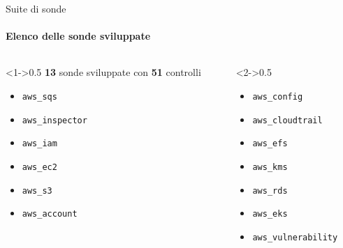 \documentclass{beamer}
\begin{document}
\begin{frame}{Suite di sonde}
    \framesubtitle{Elenco delle sonde sviluppate}
    \begin{columns}
        \begin{column}<1->{0.5\textwidth}
            \textbf{13} sonde sviluppate con \textbf{51} controlli
            \begin{itemize}
                \item \texttt{aws\_sqs}
                \item \texttt{aws\_inspector}
                \item \texttt{aws\_iam}
                \item \texttt{aws\_ec2}
                \item \texttt{aws\_s3}
                \item \texttt{aws\_account}
            \end{itemize}
        \end{column}
        \begin{column}<2->{0.5\textwidth}
            \begin{itemize}
                \item \texttt{aws\_config}
                \item \texttt{aws\_cloudtrail}
                \item  \texttt{aws\_efs}
                \item  \texttt{aws\_kms}
                \item  \texttt{aws\_rds}
                \item  \texttt{aws\_eks}
                \item <3-> \texttt{aws\_vulnerability}
            \end{itemize}
        \end{column}
    \end{columns}
\end{frame}
\end{document}
